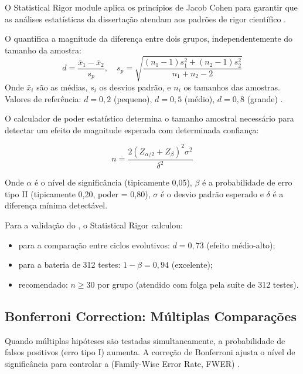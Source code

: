 O Statistical Rigor module aplica os princípios de Jacob Cohen para garantir
que as análises estatísticas da dissertação atendam aos padrões de rigor
científico \cite{cohen2018estatistica, wasserman2004all}.

\begin{definicao}
O  quantifica a magnitude da diferença entre dois grupos,
independentemente do tamanho da amostra:
\begin{equation}
d = \frac{\bar{x}_1 - \bar{x}_2}{s_p}, \quad s_p = \sqrt{\frac{(n_1-1)s_1^2 + (n_2-1)s_2^2}{n_1 + n_2 - 2}}
\end{equation}
Onde $\bar{x}_i$ são as médias, $s_i$ os desvios padrão, e $n_i$ os tamanhos
das amostras. Valores de referência: $d=0,2$ (pequeno), $d=0,5$ (médio),
$d=0,8$ (grande) \cite{cohen2018estatistica}.
\end{definicao}

O calculador de poder estatístico determina o tamanho amostral necessário para
detectar um efeito de magnitude esperada com determinada confiança:

\begin{equation}
n = \frac{2(Z_{\alpha/2} + Z_\beta)^2 \sigma^2}{\delta^2}
\end{equation}

Onde $\alpha$ é o nível de significância (tipicamente 0,05), $\beta$ é a
probabilidade de erro tipo II (tipicamente 0,20, poder = 0,80), $\sigma$ é o
desvio padrão esperado e $\delta$ é a diferença mínima detectável.

Para a validação do \opencodeeco{}, o Statistical Rigor calculou:

\begin{itemize}
\item {} para a comparação entre ciclos evolutivos: $d = 0,73$ (efeito médio-alto);
\item {} para a bateria de 312 testes: $1-\beta = 0,94$ (excelente);
\item {} recomendado: $n \geq 30$ por grupo
      (atendido com folga pela suíte de 312 testes).
\end{itemize}

\subsection{Bonferroni Correction: Múltiplas Comparações}

Quando múltiplas hipóteses são testadas simultaneamente, a probabilidade de
falsos positivos (erro tipo I) aumenta. A correção de Bonferroni ajusta o
nível de significância para controlar a 
(Family-Wise Error Rate, FWER) \cite{bonferroni1936teoria}.

